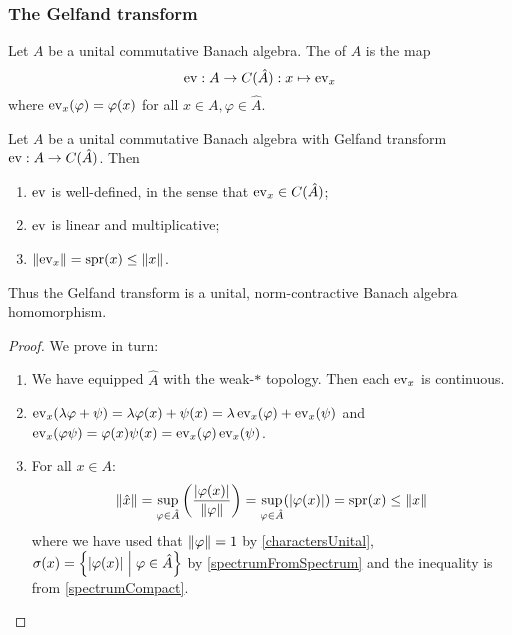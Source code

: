 \subsubsection{The Gelfand transform}
\begin{definition}
Let $A$ be a unital commutative Banach algebra. The  of $A$ is the map
\[ \operatorname{ev} : A\to C(\hat{A}): x\mapsto \operatorname{ev}_x \]
where $\operatorname{ev}_x(\varphi) = \varphi(x)$ for all $x\in A, \varphi\in\hat{A}$.
\end{definition}
\begin{lemma} \label{GelfandTransformHomomorphism}
Let $A$ be a unital commutative Banach algebra with Gelfand transform $\operatorname{ev} : A\to C(\hat{A})$. Then
\begin{enumerate}
\item $\operatorname{ev}$ is well-defined, in the sense that $\operatorname{ev}_{x} \in C(\hat{A})$;
\item $\operatorname{ev}$ is linear and multiplicative;
\item $\lVert\operatorname{ev}_{x}\rVert = \operatorname{spr}(x) \leq \lVert x\rVert$.
\end{enumerate}
Thus the Gelfand transform is a unital, norm-contractive Banach algebra homomorphism.
\end{lemma}
\begin{proof}
We prove in turn:
\begin{enumerate}
\item We have equipped $\hat{A}$ with the weak-$*$ topology. Then each $\operatorname{ev}_{x}$ is continuous.
\item $\operatorname{ev}_{x}(\lambda \varphi + \psi) = \lambda \varphi(x) + \psi(x) = \lambda\operatorname{ev}_{x}(\varphi) + \operatorname{ev}_{x}(\psi)$ and $\operatorname{ev}_{x}(\varphi\psi) = \varphi(x)\psi(x) = \operatorname{ev}_{x}(\varphi)\operatorname{ev}_{x}(\psi)$.
\item For all $x\in A$:
\[ \lVert\hat{x}\rVert = \sup_{\varphi\in\hat{A}}\left( \frac{|\varphi(x)|}{\lVert\varphi\rVert} \right) = \sup_{\varphi\in\hat{A}}(|\varphi(x)|) = \operatorname{spr}(x) \leq \lVert x\rVert \]
where we have used that $\lVert\varphi\rVert = 1$ by \ref{charactersUnital}, $\spec(x) = \setbuilder{|\varphi(x)|}{\varphi\in\hat{A}}$ by \ref{spectrumFromSpectrum} and the inequality is from \ref{spectrumCompact}.
\end{enumerate}
\end{proof}



